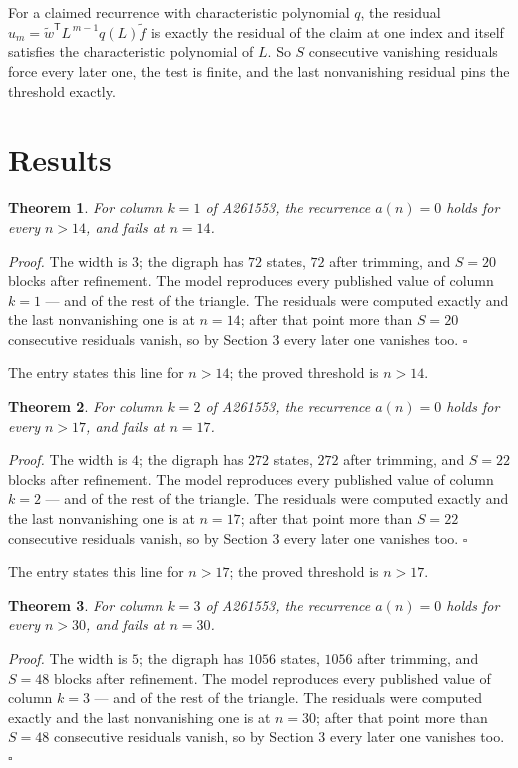 \documentclass[11pt]{article}
\newtheorem{theorem}{Theorem}
\theoremstyle{definition}
\begin{document}
For a claimed recurrence with characteristic polynomial $q$, the residual $u_m = \tilde w^{\mathsf T}L^{\,m-1}q(L)\tilde f$ is exactly the residual of the claim at one index and itself satisfies the characteristic polynomial of $L$. So $S$ consecutive vanishing residuals force every later one, the test is finite, and the last nonvanishing residual pins the threshold exactly.

\section{Results}

\begin{theorem} For column $k = 1$ of A261553, the recurrence $a(n) = 0$ holds for every $n > 14$, and fails at $n = 14$.\end{theorem}

{\itshape Proof.} The width is $3$; the digraph has $72$ states, $72$ after trimming, and $S = 20$ blocks after refinement. The model reproduces every published value of column $k = 1$ --- and of the rest of the triangle. The residuals were computed exactly and the last nonvanishing one is at $n = 14$; after that point more than $S = 20$ consecutive residuals vanish, so by Section 3 every later one vanishes too. $\square$

The entry states this line for $n > 14$; the proved threshold is $n > 14$.

\begin{theorem} For column $k = 2$ of A261553, the recurrence $a(n) = 0$ holds for every $n > 17$, and fails at $n = 17$.\end{theorem}

{\itshape Proof.} The width is $4$; the digraph has $272$ states, $272$ after trimming, and $S = 22$ blocks after refinement. The model reproduces every published value of column $k = 2$ --- and of the rest of the triangle. The residuals were computed exactly and the last nonvanishing one is at $n = 17$; after that point more than $S = 22$ consecutive residuals vanish, so by Section 3 every later one vanishes too. $\square$

The entry states this line for $n > 17$; the proved threshold is $n > 17$.

\begin{theorem} For column $k = 3$ of A261553, the recurrence $a(n) = 0$ holds for every $n > 30$, and fails at $n = 30$.\end{theorem}

{\itshape Proof.} The width is $5$; the digraph has $1056$ states, $1056$ after trimming, and $S = 48$ blocks after refinement. The model reproduces every published value of column $k = 3$ --- and of the rest of the triangle. The residuals were computed exactly and the last nonvanishing one is at $n = 30$; after that point more than $S = 48$ consecutive residuals vanish, so by Section 3 every later one vanishes too. $\square$
\end{document}
